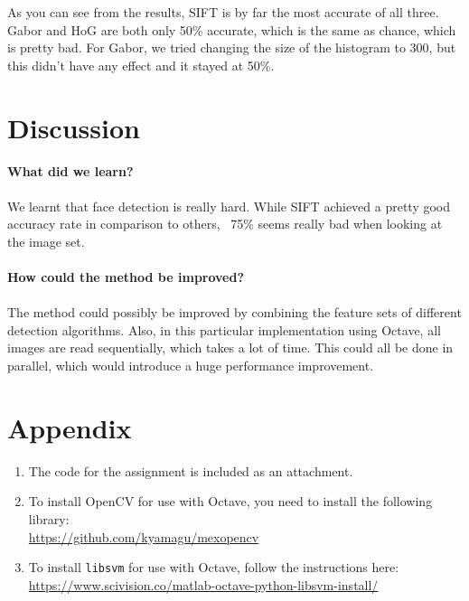 \documentclass{article}
\begin{document}
  As you can see from the results, SIFT is by far the most accurate of all three. Gabor and HoG are both only 50\% accurate, which is the same as chance, which is pretty bad. For Gabor, we tried changing the size of the histogram to 300, but this didn't have any effect and it stayed at 50\%.

  \newpage

  \section{Discussion}

  \textbf{What did we learn?}\\
  \\
  We learnt that face detection is really hard. While SIFT achieved a pretty good accuracy rate in comparison to others, ~75\% seems really bad when looking at the image set.\\
  \\
  \textbf{How could the method be improved?}\\
  \\
  The method could possibly be improved by combining the feature sets of different detection algorithms. Also, in this particular implementation using Octave, all images are read sequentially, which takes a lot of time. This could all be done in parallel, which would introduce a huge performance improvement.

  \newpage

  \section{Appendix}

  \begin{enumerate}
    \item The code for the assignment is included as an attachment.
    \item To install OpenCV for use with Octave, you need to install the following library:\\
          \url{https://github.com/kyamagu/mexopencv}
    \item To install \texttt{libsvm} for use with Octave, follow the instructions here:\\
          \url{https://www.scivision.co/matlab-octave-python-libsvm-install/}
  \end{enumerate}
\end{document}

